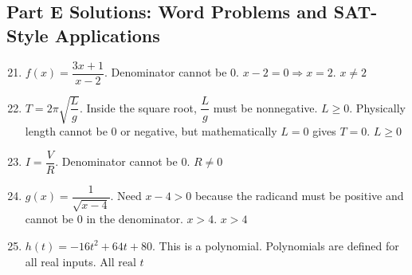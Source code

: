 \documentclass[14pt]{extarticle}
\begin{document}
\subsection*{Part E Solutions: Word Problems and SAT-Style Applications}
\begin{enumerate}
  \setcounter{enumi}{20}
  \item \(f(x) = \dfrac{3x + 1}{x - 2}\).  
  Denominator cannot be 0.  
  \(x - 2 = 0 \Rightarrow x = 2.\)  
  \(\boxed{x \ne 2}\)

  \item \(T = 2\pi \sqrt{\dfrac{L}{g}}\).  
  Inside the square root, \(\dfrac{L}{g}\) must be nonnegative.  
  \(L \ge 0.\)  
  Physically length cannot be 0 or negative, but mathematically \(L = 0\) gives \(T = 0\).  
  \(\boxed{L \ge 0}\)

  \item \(I = \dfrac{V}{R}\).  
  Denominator cannot be 0.  
  \(\boxed{R \ne 0}\)

  \item \(g(x) = \dfrac{1}{\sqrt{x - 4}}\).  
  Need \(x - 4 > 0\) because the radicand must be positive and cannot be 0 in the denominator.  
  \(x > 4.\)  
  \(\boxed{x > 4}\)

  \item \(h(t) = -16t^2 + 64t + 80\).  
  This is a polynomial. Polynomials are defined for all real inputs.  
  \(\boxed{\text{All real } t}\)
\end{enumerate}





\end{document}
